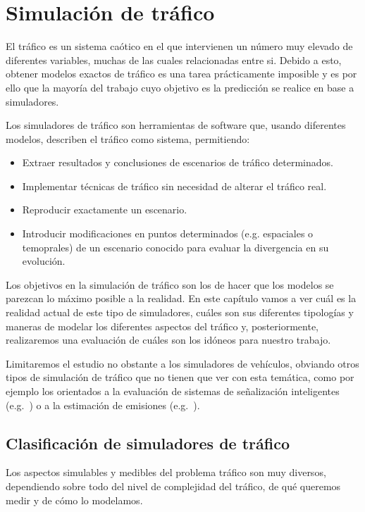\chapter{Simulación de tráfico}
\label{ch:sota-traffic-simulation}

El tráfico es un sistema caótico en el que intervienen un número muy elevado de diferentes variables, muchas de las cuales relacionadas entre si. Debido a esto, obtener modelos exactos de tráfico es una tarea prácticamente imposible y es por ello que la mayoría del trabajo cuyo objetivo es la predicción se realice en base a simuladores.

Los simuladores de tráfico son herramientas de software que, usando diferentes modelos, describen el tráfico como sistema, permitiendo:

\begin{itemize}
	\item Extraer resultados y conclusiones de escenarios de tráfico determinados.
	\item Implementar técnicas de tráfico sin necesidad de alterar el tráfico real.
	\item Reproducir exactamente un escenario.
	\item Introducir modificaciones en puntos determinados (e.g. espaciales o temoprales) de un escenario conocido para evaluar la divergencia en su evolución.
\end{itemize}

Los objetivos en la simulación de tráfico son los de hacer que los modelos se parezcan lo máximo posible a la realidad. En este capítulo vamos a ver cuál es la realidad actual de este tipo de simuladores, cuáles son sus diferentes tipologías y maneras de modelar los diferentes aspectos del tráfico y, posteriormente, realizaremos una evaluación de cuáles son los idóneos para nuestro trabajo.

Limitaremos el estudio no obstante a los simuladores de vehículos, obviando otros tipos de simulación de tráfico que no tienen que ver con esta temática, como por ejemplo los orientados a la evaluación de sistemas de señalización inteligentes (e.g.~\cite{jin2016evaluation}) o a la estimación de emisiones (e.g.~\cite{quaassdorff2016microscale}).

\section{Clasificación de simuladores de tráfico}

Los aspectos simulables y medibles del problema tráfico son muy diversos, dependiendo sobre todo del nivel de complejidad del tráfico, de qué queremos medir y de cómo lo modelamos.

